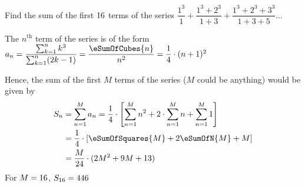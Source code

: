 



\question[4] Find the sum of the first $16$ terms of the series $\dfrac{1^3}{1} + \dfrac{1^3+2^3}{1+3} + \dfrac{1^3+2^3+3^3}{1+3+5}\ldots$


\watchout

\ifprintanswers
\fi 

\begin{solution}[\halfpage]
	The $n^{\text{th}}$ term of the series is of the form $a_n = \dfrac{\sum_{k=1}^{n}k^3}{\sum_{k=1}^{n}(2k-1)}
	= \dfrac{\eSumOfCubes{n}}{n^2} = \dfrac{1}{4}\cdot(n+1)^2$
	
	Hence, the sum of the first $M$ terms of the series ($M$ could be anything) would be given by 
	\begin{align}
		S_n &= \sum_{n=1}^{M}a_n = \dfrac{1}{4}\cdot\left[ \sum_{n=1}^{M}n^2 + 2\cdot\sum_{n=1}^{M}n + \sum_{n=1}^{M}1 \right] \\
		&= \dfrac{1}{4}\cdot\left[ \eSumOfSquares{M} + 2\eSumOfN{M} + M \right] \\ 
		&= \dfrac{M}{24}\cdot(2M^2 + 9M + 13)
	\end{align}
	For $M=16$, $S_{16} = 446$
\end{solution}
